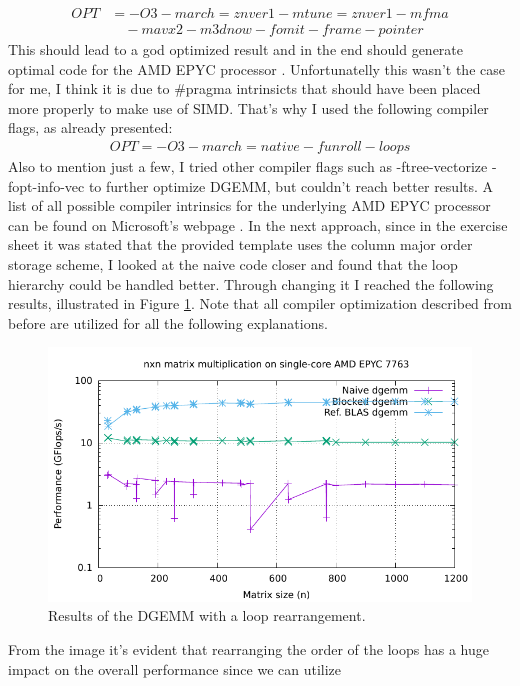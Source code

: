\documentclass[unicode,11pt,a4paper,oneside,numbers=endperiod,openany]{scrartcl}
\begin{document}
\begin{align*}
    OPT &= -O3 -march=znver1 -mtune=znver1 -mfma \\
        &\quad -mavx2 -m3dnow -fomit-frame-pointer
\end{align*}
This should lead to a god optimized result and in the end should generate optimal code for the 
AMD EPYC processor \cite{compiler_best_practice}. Unfortunatelly this wasn't the case for me, 
I think it is due to \#pragma intrinsicts that should have been placed more properly to make use of 
SIMD. That's why I used the following compiler flags, as already presented:
\begin{align*}
    OPT = -O3 -march=native -funroll-loops
\end{align*}
Also to mention just a few, I tried other compiler flags such as -ftree-vectorize -fopt-info-vec to further 
optimize DGEMM, but couldn't reach better results. A list of all possible compiler intrinsics for the underlying 
AMD EPYC processor can be found on Microsoft's webpage \cite{intrisic_list}.
\newline
In the next approach, since in the exercise sheet it was stated that the provided template uses the column major order storage 
scheme, I looked at the naive code closer and found that the loop hierarchy could be handled better. Through changing it I reached 
the following results, illustrated in Figure \ref{fig:naive}. Note that all compiler optimization described from before are 
utilized for all the following explanations.
\begin{figure}[H]
    \centering
    \includegraphics[width=\textwidth]{Images/timing_NAIVE.pdf}
    \caption{Results of the DGEMM with a loop rearrangement.}
    \label{fig:naive}
\end{figure}
From the image it's evident that rearranging the order of the loops has a huge impact on the overall performance since we can utilize 
\end{document}
